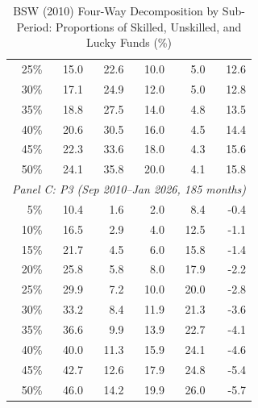 \begin{table}[!htbp]
{\begin{tabular}[t]{rrrrrr}
\hspace{1em}25\% & 15.0 & 22.6 & 10.0 & 5.0 & 12.6\\
\hspace{1em}30\% & 17.1 & 24.9 & 12.0 & 5.0 & 12.8\\
\hspace{1em}35\% & 18.8 & 27.5 & 14.0 & 4.8 & 13.5\\
\hspace{1em}40\% & 20.6 & 30.5 & 16.0 & 4.5 & 14.4\\
\hspace{1em}45\% & 22.3 & 33.6 & 18.0 & 4.3 & 15.6\\
\hspace{1em}50\% & 24.1 & 35.8 & 20.0 & 4.1 & 15.8\\
\hline
\multicolumn{6}{l}{\textit{Panel C: P3 (Sep 2010--Jan 2026, 185 months)}}\\
\hspace{1em}5\% & 10.4 & 1.6 & 2.0 & 8.4 & -0.4\\
\hspace{1em}10\% & 16.5 & 2.9 & 4.0 & 12.5 & -1.1\\
\hspace{1em}15\% & 21.7 & 4.5 & 6.0 & 15.8 & -1.4\\
\hspace{1em}20\% & 25.8 & 5.8 & 8.0 & 17.9 & -2.2\\
\hspace{1em}25\% & 29.9 & 7.2 & 10.0 & 20.0 & -2.8\\
\hspace{1em}30\% & 33.2 & 8.4 & 11.9 & 21.3 & -3.6\\
\hspace{1em}35\% & 36.6 & 9.9 & 13.9 & 22.7 & -4.1\\
\hspace{1em}40\% & 40.0 & 11.3 & 15.9 & 24.1 & -4.6\\
\hspace{1em}45\% & 42.7 & 12.6 & 17.9 & 24.8 & -5.4\\
\hspace{1em}50\% & 46.0 & 14.2 & 19.9 & 26.0 & -5.7\\
\bottomrule
\end{tabular}%
}
\setlength{\tabletempwidth}{\wd\tabletempbox}
\ifdim\tabletempwidth>\linewidth\setlength{\tabletempwidth}{\linewidth}\fi
\begin{minipage}{\tabletempwidth}
\captionsetup{width=\linewidth}
\caption{\label{tab:subperiod_bsw_decomposition}BSW (2010) Four-Way Decomposition by Sub-Period: Proportions of Skilled, Unskilled, and Lucky Funds (\%)}

\end{minipage}
\end{table}
